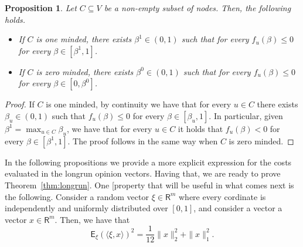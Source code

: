 \documentclass[letterpaper,11pt]{article}
\newcommand{\RR}{\mathsf{R}}
\newcommand{\EE}{\mathsf{E}}
\newtheorem{proposition}{Proposition}
\begin{document}
\begin{proposition}
\label{prop:minded}
Let $C\subseteq V$ be a non-empty subset of nodes.
Then, the following holds.
\begin{itemize}
	\item[$(a)$] If $C$ is one minded, there exists $\beta^{1}\in (0,1)$ such that for every $f_u(\beta)\le 0$ for every $\beta\in [\beta^1,1]$.
	\item[$(b)$] If $C$ is zero minded, there exists $\beta^{0}\in (0,1)$ such that for every $f_u(\beta)\le 0$ for every $\beta\in [0,\beta^0]$.
\end{itemize}
\end{proposition}

\begin{proof}
If $C$ is one minded, by continuity we have that for every $u\in C$ there exists $\beta_u\in (0,1)$ such that $f_u(\beta)\le 0$ for every $\beta\in [\beta_u,1]$. 
In particular, given $\beta^1=\max_{u\in C}\beta_u$, we have that for every $u\in C$ it holds that $f_u(\beta)<0$ for every $\beta\in [\beta^1,1]$.
The proof follows in the same way when $C$ is zero minded.
\end{proof}

In the following propositions we provide a more explicit expression for the costs evaluated in the longrun opinion vectors. 
Having that, we are ready to prove Theorem~\ref{thm:longrun}.
One [property that will be useful in what comes next is the following. 
Consider a random vector $\xi\in \RR^m$ where every cordinate is independently and uniformly distributed over $[0,1]$, and consider a vector a vector $x\in \RR^m$.
Then, we have that
\begin{equation*}
\EE_{\xi}(\langle \xi,x\rangle)^2=\frac{1}{12}\|x\|_2^2+\|x\|_1^2.
\end{equation*}
\end{document}
